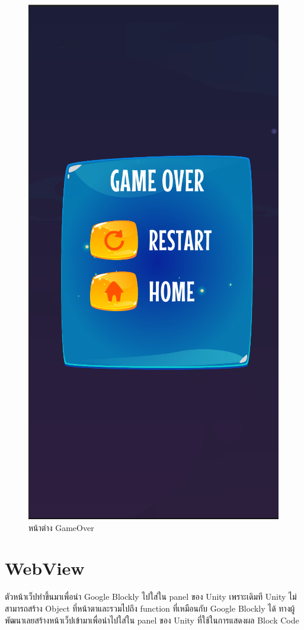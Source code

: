 \begin{figure}
\begin{center}
\includegraphics[scale = 0.4]{pic/gameover.PNG}
\end{center}
\caption[Poem]{หน้าต่าง GameOver}
\label{lose}
\end{figure}



\section{WebView}
ตัวหน้าเว็ปทำขึ้นมาเพื่อนำ Google Blockly ไปใส่ใน panel ของ Unity เพราะเดิมที Unity ไม่สามารถสร้าง Object ที่หน้าตาและรวมไปถึง function ที่เหมือนกับ Google Blockly ได้ ทางผู้พัฒนาเลยสร้างหน้าเว็ปเข้ามาเพื่อนำไปใส่ใน 
panel ของ Unity ที่ใช้ในการแสดงผล Block Code


